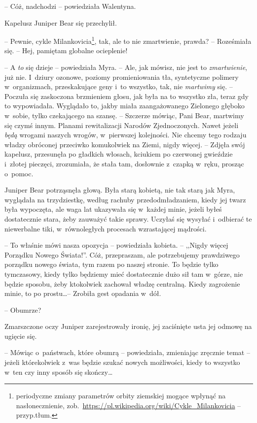 \documentclass[oneside,polish,11pt,sfheadings]{mwbk}
\begin{document}
-- Cóż, nadchodzi -- powiedziała Walentyna.

Kapelusz Juniper Bear się przechylił. 

-- Pewnie, cykle
Milankovicia\footnote{periodyczne zmiany parametrów orbity ziemskiej mogące
wpłynąć na nasłonecznienie,
zob.~\url{https://pl.wikipedia.org/wiki/Cykle\_Milankovicia} -- przyp.tłum.}, tak, ale to nie zmartwienie, prawda? -- Roześmiała się. -- Hej, pamiętam globalne ocieplenie!

-- A \textit{to} się dzieje -- powiedziała Myra. -- Ale, jak mówisz, nie jest
to \textit{zmartwienie}, już nie. I~dziury ozonowe, poziomy promieniowania
tła, syntetyczne polimery w~organizmach, przeskakujące geny i~to
wszystko, tak, nie \textit{martwimy} się. -- Poczuła się zaskoczona
brzmieniem głosu, jak była na to wszystko zła, teraz gdy to wypowiadała.
Wyglądało to, jakby miała zaangażowanego Zielonego głęboko w~sobie,
tylko czekającego na szansę. -- Szczerze mówiąc, Pani Bear, martwimy się
czymś innym. Planami rewitalizacji Narodów Zjednoczonych. Nawet jeżeli
\textit{będą} wrogami naszych wrogów, w~pierwszej kolejności. Nie chcemy
tego rodzaju władzy obróconej przeciwko komukolwiek na Ziemi, nigdy
więcej. -- Zdjęła swój kapelusz, przesunęła po gładkich włosach, kciukiem
po czerwonej gwieździe i~złotej pieczęci, zrozumiała, że stała tam,
dosłownie z~czapką w~ręku, prosząc o~pomoc.

Juniper Bear potrząsnęła głową. Była starą kobietą, nie tak starą jak
Myra, wyglądała na trzydziestkę, według rachuby przed\dywiz odmładzaniem,
kiedy jej twarz była wypoczęta, ale waga lat ukazywała się w~każdej
minie, jeżeli byłeś dostatecznie stara, żeby zauważyć takie sprawy.
Uczyłaś się wysyłać i~odbierać te niewerbalne tiki, w~równoległych
procesach wzrastającej mądrości.

-- To właśnie mówi nasza opozycja -- powiedziała kobieta. -- ,,Nigdy więcej
Porządku Nowego Świata!''. Cóż, przepraszam, ale potrzebujemy
prawdziwego porządku nowego świata, tym razem po naszej stronie. To
będzie tylko tymczasowy, kiedy tylko będziemy mieć dostatecznie dużo sił
tam w~górze, nie będzie sposobu, żeby ktokolwiek zachował władzę
centralną. Kiedy zagrożenie minie, to po prostu\ldots -- Zrobiła gest
opadania w~dół.

-- Obumrze?

Zmarszczone oczy Juniper zarejestrowały ironię, jej zaciśnięte usta jej
odmowę na ugięcie się. 

-- Mówiąc o~państwach, które obumrą -- powiedziała,
zmieniając zręcznie temat -- jeżeli którekolwiek z~was będzie szukać
nowych możliwości, kiedy to wszystko w~ten czy inny sposób się
skończy\ldots
\end{document}
